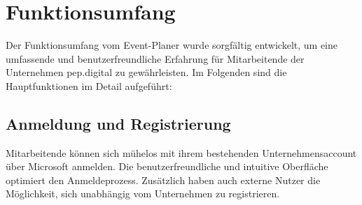 \documentclass[a4paper,12pt]{article}
\begin{document}
\newpage


\section{Funktionsumfang}
Der Funktionsumfang vom Event-Planer wurde sorgfältig entwickelt, um eine umfassende und benutzerfreundliche Erfahrung für Mitarbeitende der Unternehmen pep.digital zu gewährleisten. Im Folgenden sind die Hauptfunktionen im Detail aufgeführt:


\subsection{Anmeldung und Registrierung}
Mitarbeitende können sich mühelos mit ihrem bestehenden Unternehmensaccount über Microsoft anmelden. Die benutzerfreundliche und intuitive Oberfläche optimiert den Anmeldeprozess. Zusätzlich haben auch externe Nutzer die Möglichkeit, sich unabhängig vom Unternehmen zu registrieren.

\end{document}
